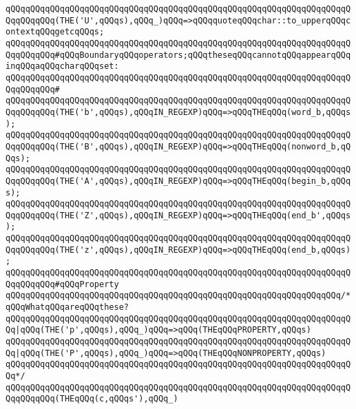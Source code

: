 \verb|qQQqqQQqqQQqqQQqqQQqqQQqqQQqqQQqqQQqqQQqqQQqqQQqqQQqqQQqqQQqqQQqqQQqqQQqqQQqqQQq(THE('U',qQQqs),qQQq_)qQQq=>qQQqquoteqQQqchar::to_upperqQQqcontextqQQqgetcqQQqs;|\newline
\newline
\verb|qQQqqQQqqQQqqQQqqQQqqQQqqQQqqQQqqQQqqQQqqQQqqQQqqQQqqQQqqQQqqQQqqQQqqQQqqQQqqQQq#qQQqBoundaryqQQqoperators;qQQqtheseqQQqcannotqQQqappearqQQqinqQQqaqQQqcharqQQqset:|\newline
\verb|qQQqqQQqqQQqqQQqqQQqqQQqqQQqqQQqqQQqqQQqqQQqqQQqqQQqqQQqqQQqqQQqqQQqqQQqqQQqqQQq#|\newline
\verb|qQQqqQQqqQQqqQQqqQQqqQQqqQQqqQQqqQQqqQQqqQQqqQQqqQQqqQQqqQQqqQQqqQQqqQQqqQQqqQQq(THE('b',qQQqs),qQQqIN_REGEXP)qQQq=>qQQqTHEqQQq(word_b,qQQqs);|\newline
\verb|qQQqqQQqqQQqqQQqqQQqqQQqqQQqqQQqqQQqqQQqqQQqqQQqqQQqqQQqqQQqqQQqqQQqqQQqqQQqqQQq(THE('B',qQQqs),qQQqIN_REGEXP)qQQq=>qQQqTHEqQQq(nonword_b,qQQqs);|\newline
\verb|qQQqqQQqqQQqqQQqqQQqqQQqqQQqqQQqqQQqqQQqqQQqqQQqqQQqqQQqqQQqqQQqqQQqqQQqqQQqqQQq(THE('A',qQQqs),qQQqIN_REGEXP)qQQq=>qQQqTHEqQQq(begin_b,qQQqs);|\newline
\verb|qQQqqQQqqQQqqQQqqQQqqQQqqQQqqQQqqQQqqQQqqQQqqQQqqQQqqQQqqQQqqQQqqQQqqQQqqQQqqQQq(THE('Z',qQQqs),qQQqIN_REGEXP)qQQq=>qQQqTHEqQQq(end_b',qQQqs);|\newline
\verb|qQQqqQQqqQQqqQQqqQQqqQQqqQQqqQQqqQQqqQQqqQQqqQQqqQQqqQQqqQQqqQQqqQQqqQQqqQQqqQQq(THE('z',qQQqs),qQQqIN_REGEXP)qQQq=>qQQqTHEqQQq(end_b,qQQqs);|\newline
\newline
\verb|qQQqqQQqqQQqqQQqqQQqqQQqqQQqqQQqqQQqqQQqqQQqqQQqqQQqqQQqqQQqqQQqqQQqqQQqqQQqqQQq#qQQqProperty|\newline
\verb|qQQqqQQqqQQqqQQqqQQqqQQqqQQqqQQqqQQqqQQqqQQqqQQqqQQqqQQqqQQqqQQqqQQq/*qQQqWhatqQQqareqQQqthese?|\newline
\verb|qQQqqQQqqQQqqQQqqQQqqQQqqQQqqQQqqQQqqQQqqQQqqQQqqQQqqQQqqQQqqQQqqQQqqQQq|\verb#|qQQq(THE('p',qQQqs),qQQq_)qQQq=>qQQq(THEqQQqPROPERTY,qQQqs)#\newline
\verb|qQQqqQQqqQQqqQQqqQQqqQQqqQQqqQQqqQQqqQQqqQQqqQQqqQQqqQQqqQQqqQQqqQQqqQQq|\verb#|qQQq(THE('P',qQQqs),qQQq_)qQQq=>qQQq(THEqQQqNONPROPERTY,qQQqs)#\newline
\verb|qQQqqQQqqQQqqQQqqQQqqQQqqQQqqQQqqQQqqQQqqQQqqQQqqQQqqQQqqQQqqQQqqQQqqQQq*/|\newline
\newline
\verb|qQQqqQQqqQQqqQQqqQQqqQQqqQQqqQQqqQQqqQQqqQQqqQQqqQQqqQQqqQQqqQQqqQQqqQQqqQQqqQQq(THEqQQq(c,qQQqs'),qQQq_)|\newline
